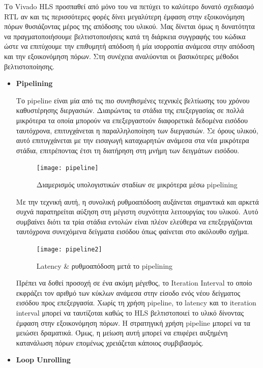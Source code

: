 Το Vivado HLS προσπαθεί από μόνο του να πετύχει το καλύτερο δυνατό σχεδιασμό RTL αν και τις περισσότερες φορές δίνει μεγαλύτερη έμφαση στην εξοικονόμηση πόρων θυσιάζοντας μέρος της απόδοσης του υλικού. Μας δίνεται όμως η δυνατότητα να πραγματοποιήσουμε βελτιστοποιήσεις κατά τη διάρκεια συγγραφής του κώδικα ώστε να επιτύχουμε την επιθυμητή απόδοση ή μία ισορροπία ανάμεσα στην απόδοση και την εξοικονόμηση πόρων. Στη συνέχεια αναλύονται οι βασικότερες μέθοδοι βελτιστοποίησης. \\
\begin{itemize}[label={},leftmargin=*]
\item{\textbf{Pipelining}}

Το pipeline είναι μία από τις πιο συνηθισμένες τεχνικές βελτίωσης του χρόνου καθυστέρησης διεργασιών. Διαιρώντας τα στάδια της επεξεργασίας σε πολλά μικρότερα τα οποία μπορούν να επεξεργαστούν διαφορετικά δεδομένα εισόδου ταυτόχρονα, επιτυγχάνεται η παραλληλοποίηση των διεργασιών. Σε όρους υλικού, αυτό επιτυγχάνεται με την εισαγωγή καταχωρητών ανάμεσα στα νέα μικρότερα στάδια, επιτρέποντας έτσι τη διατήρηση στη μνήμη των δειγμάτων εισόδου.
\begin{figure}[H]
		\centering
	\texttt{[image: pipeline]}
	\caption{Διαμερισμός υπολογιστικών σταδίων σε μικρότερα μέσω pipelining \cite{Crockett:2014:ZBE:2685817}}
	\label{fig:hlsdflow}
\end{figure}

Με την τεχνική αυτή, η συνολική ρυθμοαπόδοση αυξάνεται σημαντικά και αρκετά συχνά παρατηρείται αύξηση στη μέγιστη συχνότητα λειτουργίας του υλικού. Αυτό συμβαίνει διότι τα τρία στάδια εντολών είναι πλέον ελεύθερα να επεξεργάζονται ταυτόχρονα συνεχόμενα δείγματα εισόδου όπως φαίνεται στο ακόλουθο σχήμα.

\begin{figure}[H]
	\centering
	\texttt{[image: pipeline2]}\\
	\caption{Latency \& ρυθμοαπόδοση μετά το pipelining \cite{Crockett:2014:ZBE:2685817}}
	\label{fig:hlsdflow}
\end{figure}

Πρέπει να δοθεί προσοχή σε ένα ακόμη μέγεθος, το Iteration Interval το οποίο εκφράζει τον αριθμό των κύκλων ανάμεσα στην είσοδο ενός νέου δείγματος εισόδου προς επεξεργασία. Χωρίς τη χρήση pipeline, το latency και το iteration interval μπορεί να ταυτίζοται καθώς το HLS βελτιστοποιεί το υλικό δίνοντας έμφαση στην εξοικονόμηση πόρων. Η στρατηγική χρήση pipeline μπορεί να τα μειώσει δραματικά. Όμως, η μείωση αυτή μπορεί να επιφέρει αυξημένη κατανάλωση πόρων επομένως χρειάζεται κάποιος συμβιβασμός. \\
\item{\textbf{Loop Unrolling}}


\end{itemize}
